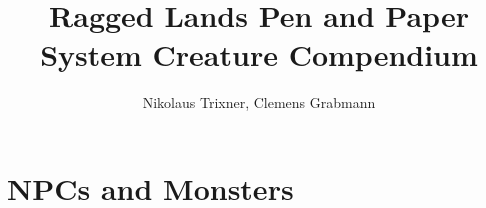 \documentclass[a4paper]{book}
\begin{document}
	\title{Ragged Lands Pen and Paper System Creature Compendium}
	\author{Nikolaus Trixner, Clemens Grabmann}
		
	\maketitle
	
	\tableofcontents


\part{NPCs and Monsters}\label{part:monsters}
	
\newpage

\begin{appendices}
	
\end{appendices}
\end{document}
